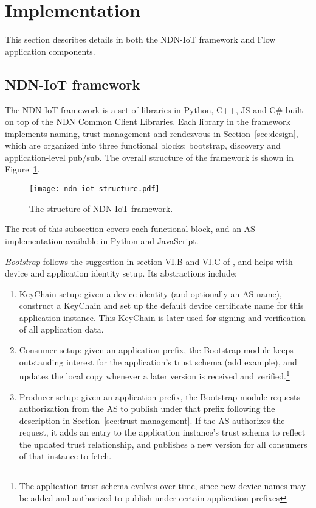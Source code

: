 \section{Implementation}
\label{sec:implementation}

This section describes details in both the NDN-IoT framework and Flow application components.

\subsection{NDN-IoT framework}
\label{sec:implementation-ndn-iot}

The NDN-IoT framework is a set of libraries in Python, C++, JS and C\# built on top of the NDN Common Client Libraries.
Each library in the framework implements naming, trust management and rendezvous in Section~\ref{sec:design}, which are organized into three functional blocks: bootstrap, discovery and application-level pub/sub.
The overall structure of the framework is shown in Figure~\ref{fig:ndn-iot-framework-structure}.

\begin{figure}[!t]
\centering
\texttt{[image: ndn-iot-structure.pdf]}
\caption{The structure of NDN-IoT framework.}
\label{fig:ndn-iot-framework-structure}
\end{figure}

The rest of this subsection covers each functional block, and an AS implementation available in Python and JavaScript.

\emph{Bootstrap} follows the suggestion in section VI.B and VI.C of \cite{ndn-iot}, and helps with device and application identity setup. 
Its abstractions include: 
\begin{enumerate}
\item KeyChain setup: given a device identity (and optionally an AS name), construct a KeyChain and set up the default device certificate name for this application instance. 
This KeyChain is later used for signing and verification of all application data.
\item Consumer setup: given an application prefix, the Bootstrap module keeps outstanding interest for the application's trust schema (add example), and updates the local copy whenever a later version is received and verified.\footnote{The application trust schema evolves over time, since new device names may be added and authorized to publish under certain application prefixes}
\item Producer setup: given an application prefix, the Bootstrap module requests authorization from the AS to publish under that prefix following the description in Section~\ref{sec:trust-management}.
If the AS authorizes the request, it adds an entry to the application instance's trust schema to reflect the updated trust relationship, and publishes a new version for all consumers of that instance to fetch.
\end{enumerate}

